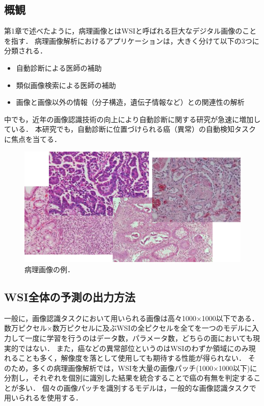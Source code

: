 \subsection{概観}
第1章で述べたように，病理画像とはWSIと呼ばれる巨大なデジタル画像のことを指す．
病理画像解析におけるアプリケーションは，大きく分けて以下の3つに分類される\cite{komuraishikawa}．
\begin{itemize}
    \item 自動診断による医師の補助
    \item 類似画像検索による医師の補助
    \item 画像と画像以外の情報（分子構造，遺伝子情報など）との関連性の解析
\end{itemize}
中でも，近年の画像認識技術の向上により自動診断に関する研究が急速に増加している\cite{doyle2008automated,dundar2011computerized}．
本研究でも，自動診断に位置づけられる癌（異常）の自動検知タスクに焦点を当てる．

\begin{figure}[tbp]
    \label{fig:path_images}
     \begin{center}
      \includegraphics[width=13cm]{figures/path_images.png}
     \end{center}
    \caption{病理画像の例．}
\end{figure}
    
\subsection{WSI全体の予測の出力方法}
一般に，画像認識タスクにおいて用いられる画像は高々1000×1000以下である．
数万ピクセル×数万ピクセルに及ぶWSIの全ピクセルを全てを一つのモデルに入力して一度に学習を行うのはデータ数，パラメータ数，どちらの面においても現実的ではない．
また，癌などの異常部位というのはWSIのわずか領域にのみ現れることも多く，解像度を落として使用しても期待する性能が得られない．
そのため，多くの病理画像解析では，WSIを大量の画像パッチ(1000×1000以下)に分割し，それぞれを個別に識別した結果を統合することで癌の有無を判定することが多い．
個々の画像パッチを識別するモデルは，一般的な画像認識タスクで用いられるを使用する．

